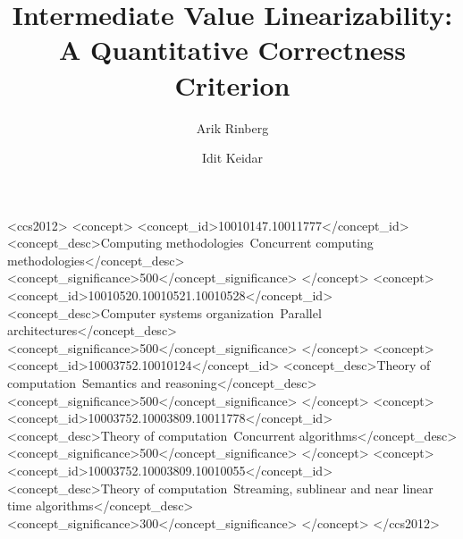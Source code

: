 \documentclass[manuscript,screen,review]{acmart}
\begin{document}

\title{Intermediate Value Linearizability: A Quantitative Correctness Criterion}



\author{Arik Rinberg}

\author{Idit Keidar}


\renewcommand{\shortauthors}{A. Rinberg and I. Keidar}







\begin{CCSXML}
<ccs2012>
<concept>
<concept_id>10010147.10011777</concept_id>
<concept_desc>Computing methodologies~Concurrent computing methodologies</concept_desc>
<concept_significance>500</concept_significance>
</concept>
<concept>
<concept_id>10010520.10010521.10010528</concept_id>
<concept_desc>Computer systems organization~Parallel architectures</concept_desc>
<concept_significance>500</concept_significance>
</concept>
<concept>
<concept_id>10003752.10010124</concept_id>
<concept_desc>Theory of computation~Semantics and reasoning</concept_desc>
<concept_significance>500</concept_significance>
</concept>
<concept>
<concept_id>10003752.10003809.10011778</concept_id>
<concept_desc>Theory of computation~Concurrent algorithms</concept_desc>
<concept_significance>500</concept_significance>
</concept>
<concept>
<concept_id>10003752.10003809.10010055</concept_id>
<concept_desc>Theory of computation~Streaming, sublinear and near linear time algorithms</concept_desc>
<concept_significance>300</concept_significance>
</concept>
</ccs2012>
\end{CCSXML}
  
\end{document}
